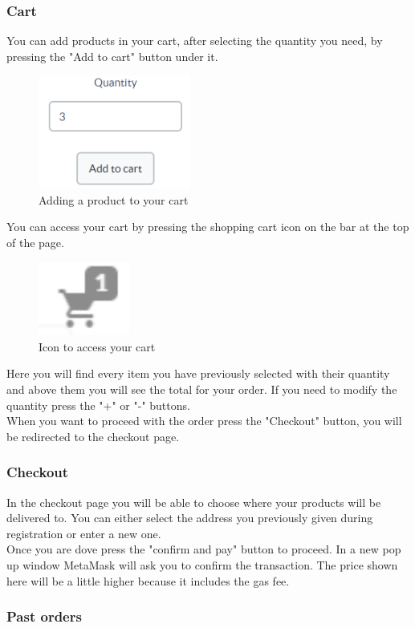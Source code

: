 	\subsubsection{Cart}
	You can add products in your cart, after selecting the quantity you need, 
	by pressing the "Add to cart" button under it. \\
	\begin{figure}[H]
		\includegraphics[width=5cm]{res/images/add_to_cart.png}
		\centering
		\caption{Adding a product to your cart}
	\end{figure}
	\noindent You can access your cart by pressing the shopping cart icon on the bar at 
	the top of the page.
	\begin{figure}[H]
		\includegraphics[width=3cm]{res/images/cart_icon.png}
		\centering
		\caption{Icon to access your cart}
	\end{figure}
	\noindent Here you will find every item you have previously selected with 
	their quantity and above them you will see the total for your order.
	If you need to modify the quantity press the "+" or "-" buttons. \\
	When you want to proceed with the order press the "Checkout" button, 
	you will be redirected to the checkout page.
	\subsubsection{Checkout}
	In the checkout page you will be able to choose where your products will be 
	delivered to. You can either select the address you previously given during
	registration or enter a new one.\\
	Once you are dove press the "confirm and pay" button to proceed. In a new 
	pop up window MetaMask will ask you to confirm the transaction. The price 
	shown here will be a little higher because it includes the gas fee.
	\subsubsection{Past orders}
	
